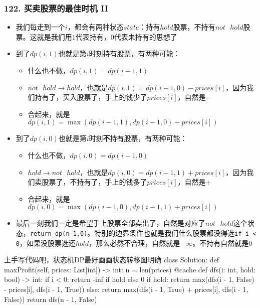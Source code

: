 \begin{frame}[fragile]          %
  \frametitle{\textsc{122. 买卖股票的最佳时机 II}}
  \begin{itemize}
    \item 我们每走到一个$i$，都会有两种状态$state$：持有$hold$股票，不持有$not \text{ } hold$股票。这就是我们用$1$代表持有，$0$代表未持有的思想了
    \item 到了$dp(i,1)$也就是第$i$时刻持有股票，有两种可能：
          \begin{itemize}
            \item 什么也不做，$dp(i,1)=dp(i-1,1)$
            \item $not\text{ } hold \to hold$，也就是$dp(i,1)=dp(i-1,0)-prices[i]$，因为我们持有了，买入股票了，手上的钱少了$prices[i]$，自然是$-$
            \item 合起来，就是$dp(i,1)=\max(dp(i-1,1),dp(i-1,0)-prices[i])$
          \end{itemize}
    \item 到了$dp(i,0)$也就是第$i$时刻\textbf{不}持有股票，有两种可能：
          \begin{itemize}
            \item 什么也不做，$dp(i,0)=dp(i-1,0)$
            \item $hold \to not\text{ } hold$，也就是$dp(i,0)=dp(i-1,1)+prices[i]$，因为我们卖股票了，不持有了，手上的钱多了$prices[i]$，自然是$+$
            \item 合起来，就是$dp(i,0)=\max(dp(i-1,0),dp(i-1,1)+prices[i])$
          \end{itemize}
    \item 最后一刻我们一定是希望手上股票全部卖出了，自然是对应了$not\text{ }hold$这个状态，\lstinline{return dp(n-1,0)}。特别的边界条件也就是我们什么股票都没得选\lstinline{if i < 0}，如果没股票选还$hold$，那么必然不合理，自然就是$-\infty$。不持有自然就是$0$
  \end{itemize}
\end{frame}


\begin{frame}[fragile]
  \begin{codeblock}[language=python]{上手写代码吧，状态机\textsc{DP}最好画画状态转移图明确}
class Solution:
    def maxProfit(self, prices: List[int]) -> int:
        n = len(prices)
        @cache
        def dfs(i: int, hold: bool) -> int:
            if i < 0:
                return -inf if hold else 0
            if hold:
                return max(dfs(i - 1, False) - prices[i], dfs(i - 1, True))
            else:
                return max(dfs(i - 1, True) + prices[i], dfs(i - 1, False))
        return dfs(n - 1, False)
  \end{codeblock}
\end{frame}



